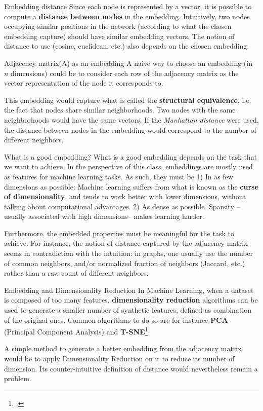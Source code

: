 \documentclass[a4paper,11pt]{book}
\begin{document}
\begin{textbox}{Embedding distance}
Since each node is represented by a vector, it is possible to compute a \textbf{distance between nodes} in the embedding. Intuitively, two nodes occupying similar positions in the network (according to what the chosen embedding capture) should have similar embedding vectors. The notion of distance to use (cosine, euclidean, etc.) also depends on the chosen embedding.
\end{textbox}

\begin{textbox}{Adjacency matrix(A) as an embedding}
A naive way to choose an embedding (in $n$ dimensions) could be to consider each row of the adjacency matrix as the vector representation of the node it corresponds to. 

This embedding would capture what is called the \textbf{structural equivalence}, i.e. the fact that nodes share similar neighborhoods. Two nodes with the same neighborhoods would have the same vectors. If the \textit{Manhattan distance} were used, the distance between nodes in the embedding would correspond to the number of different neighbors.
\end{textbox}

\begin{textbox}{What is a good embedding?}
What is a good embedding depends on the task that we want to achieve. In the perspective of this class, embeddings are mostly used as features for machine learning tasks. As such, they must be 1) In as few dimensions as possible: Machine learning suffers from what is known as the \textbf{curse of dimensionality}, and tends to work better with lower dimensions, without talking about computational advantages. 2) As dense as possible. Sparsity --usually associated with high dimensions-- makes learning harder.

Furthermore, the embedded properties must be meaningful for the task to achieve. For instance, the notion of distance captured by the adjacency matrix seems in contradiction with the intuition: in graphs, one usually use the number of common neighbors, and/or normalized fraction of neighbors (Jaccard, etc.) rather than a raw count of different neighbors.
\end{textbox}


\begin{textbox}{Embedding and Dimensionality Reduction}
In Machine Learning, when a dataset is composed of too many features, \textbf{dimensionality reduction} algorithms can be used to generate a smaller number of synthetic features, defined as combination of the original ones. Common algorithms to do so are for instance \textbf{PCA} (Principal Component Analysis) and \textbf{T-SNE}\footcite{maaten2008visualizing}. 

A simple method to generate a better embedding from the adjacency matrix would be to apply Dimensionality Reduction on it to reduce its number of dimension. Its counter-intuitive definition of distance would nevertheless remain a problem. 
\end{textbox}
\end{document}
